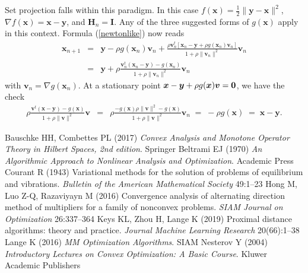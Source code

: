 \documentclass[11pt]{article}
\newcommand{\bv}{\boldsymbol{v}}
\newcommand{\bx}{\boldsymbol{x}}
\newcommand{\by}{\boldsymbol{y}}
\newcommand{\bH}{\boldsymbol{H}}
\newcommand{\bI}{\boldsymbol{I}}
\begin{document}
Set projection falls within this paradigm. In this case
$f(\bx)=\frac{1}{2}\|\by-\bx\|^2$, $\nabla f(\bx)=\bx-\by$, and $\bH_n = \bI$. Any of the three suggested forms of $g(\bx)$ apply in
this context. Formula (\ref{newtonlike}) now reads
\begin{eqnarray*}
\bx_{n+1} & = & \by - \rho g(\bx_n)\bv_n
+ \frac{\rho\bv_n^t [\bx_n-\by+\rho g(\bx_n)\bv_n]  }
{1+\rho \|\bv_n\|^2}\bv_n \\
& = & \by+\rho\frac{\bv_n^t(\bx_n-\by)-g(\bx_n)}
{1+\rho \|\bv_n\|^2}\bv_n
\end{eqnarray*}
with $\bv_n = \nabla g(\bx_n)$. At a stationary point
$\bx -\by + \rho g(\bx) \bv = {\bf 0}$, we have the check
\begin{eqnarray*}
\rho\frac{\bv^t(\bx-\by)-g(\bx)}
{1+\rho \|\bv\|^2}\bv & \!\! = \!\! & \rho\frac{-g(\bx)\rho \|\bv\|^2-g(\bx)}
{1+\rho \|\bv\|^2}\bv_n \; = \; -\rho g(\bx)
\; = \; \bx-\by.
\end{eqnarray*}

 

\begin{thebibliography}{99}
Bauschke HH, Combettes PL (2017) {\it Convex Analysis and Monotone Operator Theory in Hilbert Spaces, 2nd edition}. Springer
Beltrami EJ (1970) {\it An Algorithmic Approach to Nonlinear Analysis and Optimization}. Academic Press
Courant R (1943) Variational methods for the solution of problems of equilibrium and vibrations. {\it Bulletin of the American Mathematical Society} 49:1--23
Hong M, Luo Z-Q, Razaviyayn M (2016) Convergence analysis of alternating direction method of multipliers for a family of 
nonconvex problems. {\it SIAM Journal on Optimization} 26:337--364
Keys KL, Zhou H, Lange K (2019) Proximal distance algorithms: 
theory and practice. {\it Journal Machine Learning Research}
20(66):1--38
Lange K (2016) {\it MM Optimization Algorithms}. SIAM
Nesterov Y (2004) {\it Introductory Lectures on Convex Optimization:  A Basic Course}. Kluwer Academic Publishers
\end{thebibliography}
\end{document}
